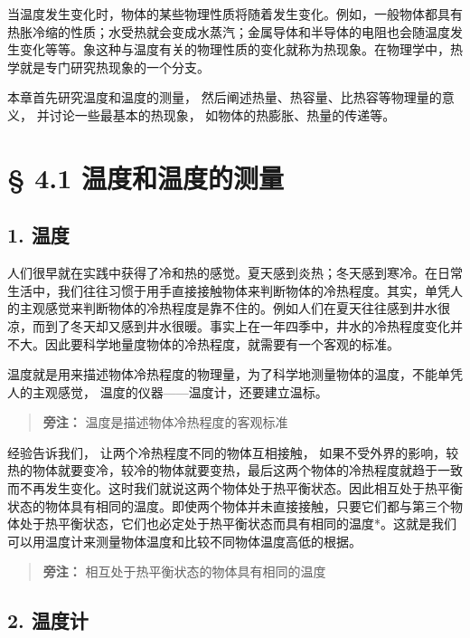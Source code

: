 当温度发生变化时，物体的某些物理性质将随着发生变化。例如，一般物体都具有热胀冷缩的性质；水受热就会变成水蒸汽；金属导体和半导体的电阻也会随温度发生变化等等。象这种与温度有关的物理性质的变化就称为热现象。在物理学中，热学就是专门研究热现象的一个分支。

本章首先研究温度和温度的测量，
然后阐述热量、热容量、比热容等物理量的意义， 并讨论一些最基本的热现象，
如物体的热膨胀、热量的传递等。

\section{§ 4.1
温度和温度的测量}\label{ux6e29ux5ea6ux548cux6e29ux5ea6ux7684ux6d4bux91cf}

\subsection{1. 温度}\label{ux6e29ux5ea6}

人们很早就在实践中获得了冷和热的感觉。夏天感到炎热；冬天感到寒冷。在日常生活中，我们往往习惯于用手直接接触物体来判断物体的冷热程度。其实，单凭人的主观感觉来判断物体的冷热程度是靠不住的。例如人们在夏天往往感到井水很凉，而到了冬天却又感到井水很暖。事实上在一年四季中，井水的冷热程度变化并不大。因此要科学地量度物体的冷热程度，就需要有一个客观的标准。

温度就是用来描述物体冷热程度的物理量，为了科学地测量物体的温度，不能单凭人的主观感觉，
温度的仪器------温度计，还要建立温标。

\begin{quote}
\textbf{旁注：} 温度是描述物体冷热程度的客观标准
\end{quote}

经验告诉我们， 让两个冷热程度不同的物体互相接触，
如果不受外界的影响，较热的物体就要变冷，较冷的物体就要变热，最后这两个物体的冷热程度就趋于一致而不再发生变化。这时我们就说这两个物体处于热平衡状态。因此相互处于热平衡状态的物体具有相同的温度。即使两个物体并未直接接触，只要它们都与第三个物体处于热平衡状态，它们也必定处于热平衡状态而具有相同的温度*。这就是我们可以用温度计来测量物体温度和比较不同物体温度高低的根据。

\begin{quote}
\textbf{旁注：} 相互处于热平衡状态的物体具有相同的温度
\end{quote}

\subsection{2. 温度计}\label{ux6e29ux5ea6ux8ba1}

